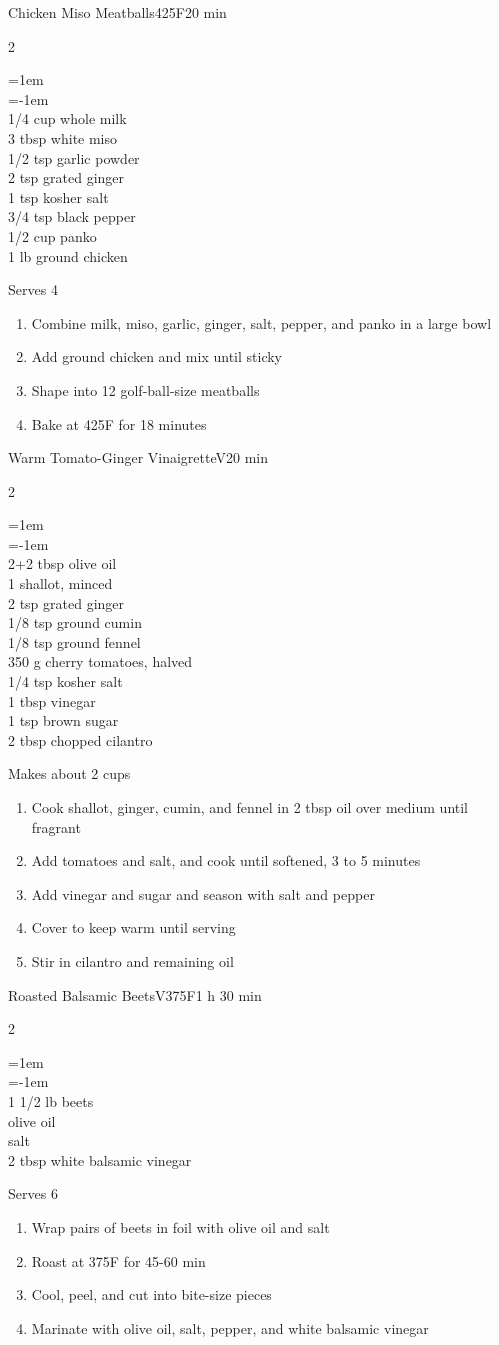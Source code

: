 \documentclass{article}
\newenvironment{recipe}[3][]
    {\begin{cardbase}[#1]{#2}{#3}
    \columnratio{0.333}
    \begin{paracol}{2}}
    {\end{paracol}\end{cardbase}}
\newcommand{\nextcolumn}{\switchcolumn}
\newenvironment{ingredients}
    {
    \begin{obeylines}
    \vspace{\parskip}
    \setlength{\parskip}{0.25em}
    \vspace{-0.25em}
    \leftskip=1em
    \parindent=-1em}
    {\end{obeylines}}
\newenvironment{steps}
    {\begin{enumerate}[leftmargin=*,topsep=0pt]}
    {\end{enumerate}}
\newcommand{\fahrenheit}[1]{#1\textdegree{}F}
\newcommand{\tag}[1]{\hspace{1em}#1}
\newcommand{\symboltag}[2]{\tag{#1\hspace{0.4em}#2}}
\newcommand{\totaltime}[1]{\symboltag{\raisebox{-0.1em}{\small\StopWatchEnd}}{#1}}
\newcommand{\preheat}[1]{\symboltag{\Topbottomheat}{#1}}
\begin{document}
\begin{recipe}{Chicken Miso Meatballs}{\preheat{\fahrenheit{425}}\totaltime{20 min}}
\begin{ingredients}
1/4 cup whole milk
3 tbsp white miso
1/2 tsp garlic powder
2 tsp grated ginger
1 tsp kosher salt
3/4 tsp black pepper
1/2 cup panko
1 lb ground chicken
\end{ingredients}
\nextcolumn
Serves 4
\begin{steps}
    \item Combine milk, miso, garlic, ginger, salt, pepper, and panko in a large bowl
    \item Add ground chicken and mix until sticky
    \item Shape into 12 golf-ball-size meatballs
    \item Bake at \fahrenheit{425} for 18 minutes
\end{steps}
\end{recipe}

\begin{recipe}{Warm Tomato-Ginger Vinaigrette}{\tag{V}\totaltime{20 min}}
\begin{ingredients}
2+2 tbsp olive oil
1 shallot, minced
2 tsp grated ginger
1/8 tsp ground cumin
1/8 tsp ground fennel
350 g cherry tomatoes, halved
1/4 tsp kosher salt
1 tbsp vinegar
1 tsp brown sugar
2 tbsp chopped cilantro
\end{ingredients}
\nextcolumn
Makes about 2 cups
\begin{steps}
    \item Cook shallot, ginger, cumin, and fennel in 2 tbsp oil over medium until fragrant
    \item Add tomatoes and salt, and cook until softened, 3 to 5 minutes
    \item Add vinegar and sugar and season with salt and pepper
    \item Cover to keep warm until serving
    \item Stir in cilantro and remaining oil
\end{steps}
\end{recipe}

\begin{recipe}{Roasted Balsamic Beets}{\tag{V}\preheat{\fahrenheit{375}}\totaltime{1 h 30 min}}
\begin{ingredients}
1 1/2 lb beets
olive oil
salt
2 tbsp white balsamic vinegar
\end{ingredients}
\nextcolumn
Serves 6
\begin{steps}
\item Wrap pairs of beets in foil with olive oil and salt
\item Roast at \fahrenheit{375} for 45-60 min
\item Cool, peel, and cut into bite-size pieces
\item Marinate with olive oil, salt, pepper, and white balsamic vinegar
\end{steps}
\end{recipe}
\end{document}
